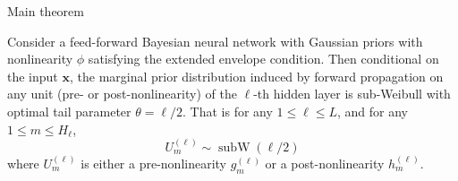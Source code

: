 \documentclass[10pt, handout, envcountsect]{beamer} %
\begin{document}
\begin{frame}{Main theorem}


\begin{theorem}
Consider a feed-forward Bayesian neural network with Gaussian priors with nonlinearity $\phi$ satisfying the extended envelope condition. Then conditional on the input $\boldsymbol{x}$, the marginal prior distribution induced by forward propagation on any unit (pre- or post-nonlinearity) of the $\ell$-th hidden layer is sub-Weibull with optimal tail parameter $\theta=\ell / 2$. That is for any $1 \leq \ell \leq L$, and for any $1 \leq m \leq H_{\ell}$,
$$
U_m^{(\ell)} \sim \operatorname{subW}(\ell / 2)
$$
where $U_m^{(\ell)}$ is either a pre-nonlinearity $g_m^{(\ell)}$ or a post-nonlinearity $h_m^{(\ell)}$.
    
\end{theorem}
    
\end{frame}
\end{document}
